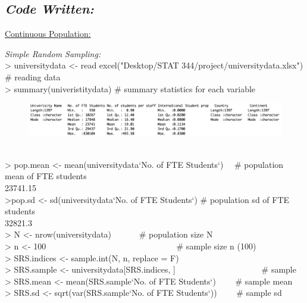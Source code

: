 \documentclass{article}
\begin{document}
\subsection{\textbf{\textit{Code Written:}}}
\underline{Continuous Population:}

\noindent\textit{Simple Random Sampling:}\\
\textgreater\hspace{1mm} universitydata \textless- read \textunderscore excel("Desktop/STAT 344/project/universitydata.xlsx")    \# reading data\\
\textgreater\hspace{1mm} summary(univeristitydata)    \# summary statistics for each variable
\begin{figure}[htp]
\includegraphics[width=18cm]{summarydata.png}
\label{lable:sunmary}
\end{figure} \\
\textgreater\hspace{1mm} pop.mean \textless- mean(universitydata\textdollar`No. of FTE Students`)~~ \# population mean of FTE students\\
  23741.15\\
\textgreater\hspace{1mm}pop.sd \textless- sd(universitydata\textdollar `No. of FTE Students`) \# population sd of FTE students\\
  32821.3\\
\textgreater\hspace{1mm} N \textless- nrow(universitydata)~~~~~~ \# population size N\\
\textgreater\hspace{1mm} n \textless- 100 ~~~~~~~~~~~~~~~~~~~~~~~~~~~~~~ \# sample size n (100)\\
\textgreater\hspace{1mm} SRS.indices \textless- sample.int(N, n, replace = F)\\
\textgreater\hspace{1mm} SRS.sample \textless- universitydata[SRS.indices, ] ~~~~~~~~~~~~~~~~~~~~\# sample\\
\textgreater\hspace{1mm} SRS.mean \textless- mean(SRS.sample\textdollar`No. of FTE Students`)~~~~ \# sample mean\\
\textgreater\hspace{1mm} SRS.sd \textless- sqrt(var(SRS.sample\textdollar`No. of FTE Students`)) ~~~~\# sample sd\\
\end{document}
